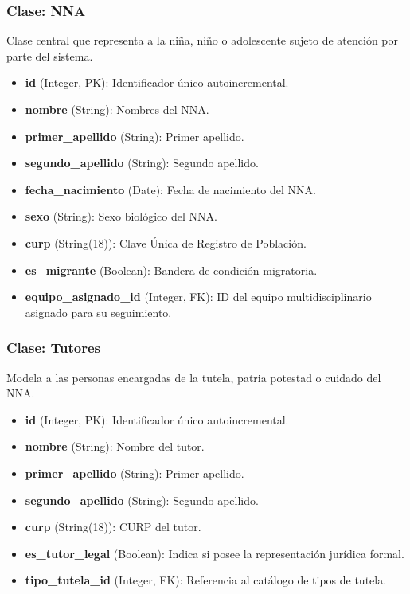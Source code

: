 \subsubsection{Clase: NNA}
Clase central que representa a la niña, niño o adolescente sujeto de atención por parte del sistema.
\begin{itemize}
	\item \textbf{id} (Integer, PK): Identificador único autoincremental.
	\item \textbf{nombre} (String): Nombres del NNA.
	\item \textbf{primer\_apellido} (String): Primer apellido.
	\item \textbf{segundo\_apellido} (String): Segundo apellido.
	\item \textbf{fecha\_nacimiento} (Date): Fecha de nacimiento del NNA.
	\item \textbf{sexo} (String): Sexo biológico del NNA.
	\item \textbf{curp} (String(18)): Clave Única de Registro de Población.
	\item \textbf{es\_migrante} (Boolean): Bandera de condición migratoria.
	\item \textbf{equipo\_asignado\_id} (Integer, FK): ID del equipo multidisciplinario asignado para su seguimiento.
\end{itemize}

\subsubsection{Clase: Tutores}
Modela a las personas encargadas de la tutela, patria potestad o cuidado del NNA.
\begin{itemize}
	\item \textbf{id} (Integer, PK): Identificador único autoincremental.
	\item \textbf{nombre} (String): Nombre del tutor.
	\item \textbf{primer\_apellido} (String): Primer apellido.
	\item \textbf{segundo\_apellido} (String): Segundo apellido.
	\item \textbf{curp} (String(18)): CURP del tutor.
	\item \textbf{es\_tutor\_legal} (Boolean): Indica si posee la representación jurídica formal.
	\item \textbf{tipo\_tutela\_id} (Integer, FK): Referencia al catálogo de tipos de tutela.
\end{itemize}

